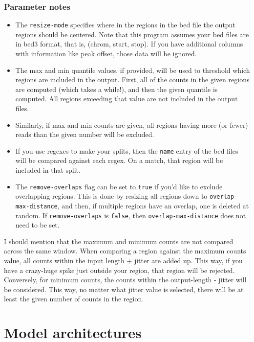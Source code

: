 \documentclass{article}
\begin{document}
\subsubsection{Parameter notes}

\begin{itemize}
    \item The \texttt{resize-mode} specifies where in the regions in the bed file the output regions should be centered. Note that this program assumes your bed files are in bed3 format, that is, (chrom, start, stop). If you have additional columns with information like peak offset, those data will be ignored. 
    \item The max and min quantile values, if provided, will be used to threshold which regions are included in the output. First, all of the counts in the given regions are computed (which takes a while!), and then the given quantile is computed. All regions exceeding that value are not included in the output files. 
    \item Similarly, if max and min counts are given, all regions having more (or fewer) reads than the given number will be excluded. 
    \item If you use regexes to make your splits, then the \texttt{name} entry of the bed files will be compared against each regex. On a match, that region will be included in that split. 
    \item The \texttt{remove-overlaps} flag can be set to \texttt{true} if you'd like to exclude overlapping regions. This is done by resizing all regions down to \texttt{overlap-max-distance}, and then, if multiple regions have an overlap, one is deleted at random. If \texttt{remove-overlaps} is \texttt{false}, then \texttt{overlap-max-distance} does not need to be set.  
\end{itemize}

I should mention that the maximum and minimum counts are not compared across the same window. 
When comparing a region against the maximum counts value, all counts within the input length + jitter are added up. This way, if you have a crazy-huge spike just outside your region, that region will be rejected. 
Conversely, for minimum counts, the counts within the output-length - jitter will be considered. This way, no matter what jitter value is selected, there will be at least the given number of counts in the region. 






\newpage
\section{Model architectures}\label{sec:modelArchitectures}
\end{document}
